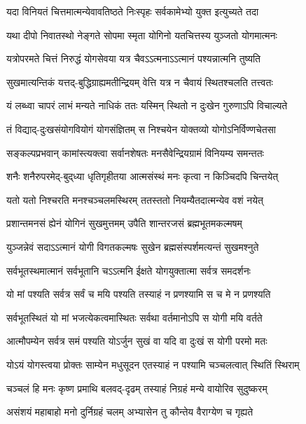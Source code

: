 \twolineshloka
{यदा विनियतं चित्तमात्मन्येवावतिष्ठते}
{निःस्पृहः सर्वकामेभ्यो युक्त इत्युच्यते तदा}%

\twolineshloka
{यथा दीपो निवातस्थो नेङ्गते सोपमा स्मृता}
{योगिनो यतचित्तस्य युञ्जतो योगमात्मनः}%

\twolineshloka
{यत्रोपरमते चित्तं निरुद्धं योगसेवया}
{यत्र चैवऽऽत्मनाऽऽत्मानं पश्यन्नात्मनि तुष्यति}%

\twolineshloka
{सुखमात्यन्तिकं यत्तद्-बुद्धिग्राह्यमतीन्द्रियम्}
{वेत्ति यत्र न चैवायं स्थितश्चलति तत्त्वतः}%

\twolineshloka
{यं लब्ध्वा चापरं लाभं मन्यते नाधिकं ततः}
{यस्मिन् स्थितो न दुःखेन गुरुणाऽपि विचाल्यते}%

\twolineshloka
{तं विद्याद्-दुःखसंयोगवियोगं योगसंज्ञितम्}
{स निश्चयेन योक्तव्यो योगोऽनिर्विण्णचेतसा}%

\twolineshloka
{सङ्कल्पप्रभवान् कामांस्त्यक्त्वा सर्वानशेषतः}
{मनसैवेन्द्रियग्रामं विनियम्य समन्ततः}%

\twolineshloka
{शनैः शनैरुपरमेद्-बुद्‌ध्या धृतिगृहीतया}
{आत्मसंस्थं मनः कृत्वा न किञ्चिदपि चिन्तयेत्}%

\twolineshloka
{यतो यतो निश्चरति मनश्चञ्चलमस्थिरम्}
{ततस्ततो नियम्यैतदात्मन्येव वशं नयेत्}%

\twolineshloka
{प्रशान्तमनसं ह्येनं योगिनं सुखमुत्तमम्}
{उपैति शान्तरजसं ब्रह्मभूतमकल्मषम्}%

\twolineshloka
{युञ्जन्नेवं सदाऽऽत्मानं योगी विगतकल्मषः}
{सुखेन ब्रह्मसंस्पर्शमत्यन्तं सुखमश्नुते}%

\twolineshloka
{सर्वभूतस्थमात्मानं सर्वभूतानि चऽऽत्मनि}
{ईक्षते योगयुक्तात्मा सर्वत्र समदर्शनः}%

\twolineshloka
{यो मां पश्यति सर्वत्र सर्वं च मयि पश्यति}
{तस्याहं न प्रणश्यामि स च मे न प्रणश्यति}%

\twolineshloka
{सर्वभूतस्थितं यो मां भजत्येकत्वमास्थितः}
{सर्वथा वर्तमानोऽपि स योगी मयि वर्तते}%

\twolineshloka
{आत्मौपम्येन सर्वत्र समं पश्यति योऽर्जुन}
{सुखं वा यदि वा दुःखं स योगी परमो मतः}%

\twolineshloka
{योऽयं योगस्त्वया प्रोक्तः साम्येन मधुसूदन}
{एतस्याहं न पश्यामि चञ्चलत्वात् स्थितिं स्थिराम्}%

\twolineshloka
{चञ्चलं हि मनः कृष्ण प्रमाथि बलवद्-दृढम्}
{तस्याहं निग्रहं मन्ये वायोरिव सुदुष्करम्}%

\twolineshloka
{असंशयं महाबाहो मनो दुर्निग्रहं चलम्}
{अभ्यासेन तु कौन्तेय वैराग्येण च गृह्यते}%

